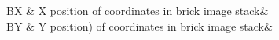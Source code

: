 BX		  &		X position of coordinates in brick image stack& \\
BY		&   		Y position) of coordinates in brick image stack& \\
